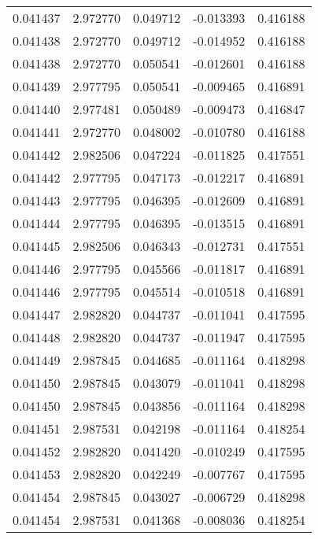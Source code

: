 \begin{tabular}{lrrrr}
0.041437    &  2.972770 &  0.049712 & -0.013393 &             0.416188 \\
0.041438    &  2.972770 &  0.049712 & -0.014952 &             0.416188 \\
0.041438    &  2.972770 &  0.050541 & -0.012601 &             0.416188 \\
0.041439    &  2.977795 &  0.050541 & -0.009465 &             0.416891 \\
0.041440    &  2.977481 &  0.050489 & -0.009473 &             0.416847 \\
0.041441    &  2.972770 &  0.048002 & -0.010780 &             0.416188 \\
0.041442    &  2.982506 &  0.047224 & -0.011825 &             0.417551 \\
0.041442    &  2.977795 &  0.047173 & -0.012217 &             0.416891 \\
0.041443    &  2.977795 &  0.046395 & -0.012609 &             0.416891 \\
0.041444    &  2.977795 &  0.046395 & -0.013515 &             0.416891 \\
0.041445    &  2.982506 &  0.046343 & -0.012731 &             0.417551 \\
0.041446    &  2.977795 &  0.045566 & -0.011817 &             0.416891 \\
0.041446    &  2.977795 &  0.045514 & -0.010518 &             0.416891 \\
0.041447    &  2.982820 &  0.044737 & -0.011041 &             0.417595 \\
0.041448    &  2.982820 &  0.044737 & -0.011947 &             0.417595 \\
0.041449    &  2.987845 &  0.044685 & -0.011164 &             0.418298 \\
0.041450    &  2.987845 &  0.043079 & -0.011041 &             0.418298 \\
0.041450    &  2.987845 &  0.043856 & -0.011164 &             0.418298 \\
0.041451    &  2.987531 &  0.042198 & -0.011164 &             0.418254 \\
0.041452    &  2.982820 &  0.041420 & -0.010249 &             0.417595 \\
0.041453    &  2.982820 &  0.042249 & -0.007767 &             0.417595 \\
0.041454    &  2.987845 &  0.043027 & -0.006729 &             0.418298 \\
0.041454    &  2.987531 &  0.041368 & -0.008036 &             0.418254 \\

\end{tabular}
